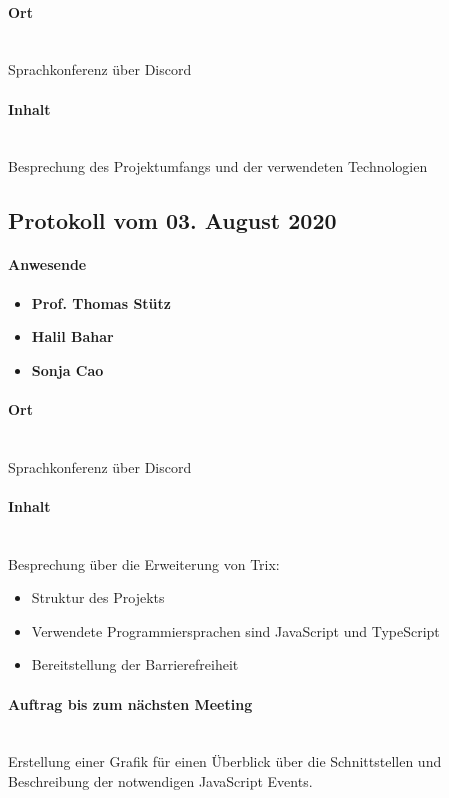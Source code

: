 \paragraph{Ort}\mbox{}\\
Sprachkonferenz über Discord

\paragraph{Inhalt}\mbox{}\\
Besprechung des Projektumfangs und der verwendeten Technologien

\subsection{Protokoll vom 03. August 2020}

\paragraph{Anwesende}
\begin{itemize}
	\item{\textbf{Prof. Thomas Stütz}}
	\item{\textbf{Halil Bahar}}
	\item{\textbf{Sonja Cao}}
\end{itemize}

\paragraph{Ort}\mbox{}\\
Sprachkonferenz über Discord

\paragraph{Inhalt}\mbox{}\\
Besprechung über die Erweiterung von Trix:
\begin{itemize}
	\item{Struktur des Projekts}
	\item{Verwendete Programmiersprachen sind JavaScript und TypeScript}
	\item{Bereitstellung der Barrierefreiheit}
\end{itemize}

\paragraph{Auftrag bis zum nächsten Meeting}\mbox{}\\
Erstellung einer Grafik für einen Überblick über die Schnittstellen und Beschreibung der notwendigen JavaScript Events.

